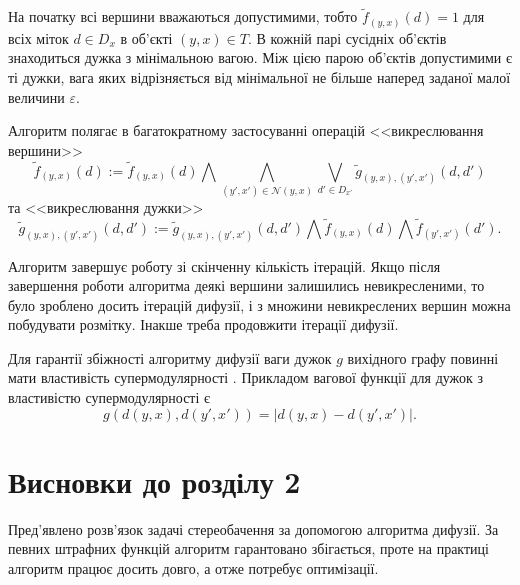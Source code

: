 На початку всі вершини вважаються допустимими, тобто
$\tilde{f}_{\left(y, x \right)} \left(d \right) = 1$ для всіх
міток $d \in D_x$ в об'єкті $\left(y,x \right) \in T$.
В кожній парі сусідніх об'єктів знаходиться дужка з мінімальною вагою.
Між цією парою об'єктів допустимими є ті дужки,
вага яких відрізняється від мінімальної не більше
наперед заданої малої величини $\varepsilon$.

Алгоритм полягає в багатократному застосуванні операцій
<<викреслювання вершини>>
\begin{equation*}
    \tilde{f}_{\left(y, x \right)} \left(d \right)
    := \tilde{f}_{\left(y, x \right)} \left(d \right)
    \bigwedge \bigwedge \limits_{\left(y', x' \right)\in \mathcal{N}\left(y,x \right)}
        \bigvee \limits_{d' \in D_{x'}}
            \tilde{g}_{\left(y,x \right), \left(y', x' \right)}
                \left(d, d' \right)
\end{equation*}
та <<викреслювання дужки>>
\begin{equation*}
    \tilde{g}_{\left(y,x \right), \left(y', x' \right)} \left(d, d' \right)
    := \tilde{g}_{\left(y,x \right), \left(y', x' \right)} \left(d, d' \right)
    \bigwedge \tilde{f}_{\left(y, x \right)} \left(d \right)
    \bigwedge \tilde{f}_{\left(y', x' \right)} \left(d' \right).
\end{equation*}


Алгоритм завершує роботу зі скінченну кількість ітерацій.
Якщо після завершення роботи алгоритма деякі вершини залишились невикресленими,
то було зроблено досить ітерацій дифузії,
і з множини невикреслених вершин можна побудувати розмітку.
Інакше треба продовжити ітерації дифузії.


Для гарантії збіжності алгоритму дифузії ваги дужок $g$
вихідного графу повинні мати властивість супермодулярності
\cite{diffusion:shlezinger:supermodularity}.
Прикладом вагової функції для дужок з властивістю супермодулярності є
\begin{equation*}
    g \left( d \left( y, x \right), d \left( y', x' \right) \right)
    = \left| d \left( y, x \right) - d \left( y', x' \right) \right|.
\end{equation*}


\section*{Висновки до розділу 2}

Пред'явлено розв'язок задачі стереобачення за допомогою алгоритма дифузії.
За певних штрафних функцій алгоритм гарантовано збігається,
проте на практиці алгоритм працює досить довго, а отже потребує оптимізації.
